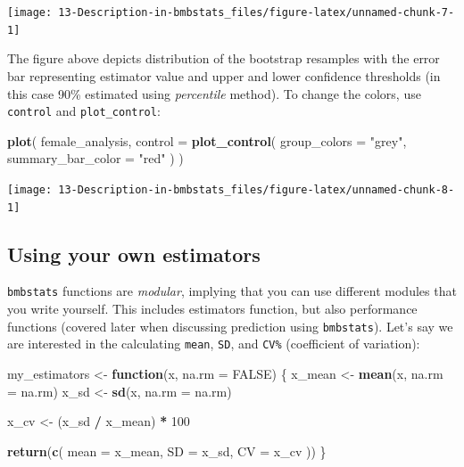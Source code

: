 \documentclass[
]{book}
\newenvironment{Shaded}{\begin{snugshade}}{\end{snugshade}}
\newcommand{\ControlFlowTok}[1]{\textcolor[rgb]{0.13,0.29,0.53}{\textbf{#1}}}
\newcommand{\DataTypeTok}[1]{\textcolor[rgb]{0.13,0.29,0.53}{#1}}
\newcommand{\DecValTok}[1]{\textcolor[rgb]{0.00,0.00,0.81}{#1}}
\newcommand{\KeywordTok}[1]{\textcolor[rgb]{0.13,0.29,0.53}{\textbf{#1}}}
\newcommand{\NormalTok}[1]{#1}
\newcommand{\OperatorTok}[1]{\textcolor[rgb]{0.81,0.36,0.00}{\textbf{#1}}}
\newcommand{\OtherTok}[1]{\textcolor[rgb]{0.56,0.35,0.01}{#1}}
\newcommand{\StringTok}[1]{\textcolor[rgb]{0.31,0.60,0.02}{#1}}
\begin{document}
\begin{center}\texttt{[image: 13-Description-in-bmbstats\_files/figure-latex/unnamed-chunk-7-1]} \end{center}

The figure above depicts distribution of the bootstrap resamples with the error bar representing estimator value and upper and lower confidence thresholds (in this case 90\% estimated using \emph{percentile} method). To change the colors, use \texttt{control} and \texttt{plot\_control}:

\begin{Shaded}
\begin{Highlighting}[]
\KeywordTok{plot}\NormalTok{(}
\NormalTok{  female\_analysis,}
  \DataTypeTok{control =} \KeywordTok{plot\_control}\NormalTok{(}
    \DataTypeTok{group\_colors =} \StringTok{"grey"}\NormalTok{,}
    \DataTypeTok{summary\_bar\_color =} \StringTok{"red"}
\NormalTok{  )}
\NormalTok{)}
\end{Highlighting}
\end{Shaded}

\begin{center}\texttt{[image: 13-Description-in-bmbstats\_files/figure-latex/unnamed-chunk-8-1]} \end{center}

\hypertarget{using-your-own-estimators}{%
\subsection{Using your own estimators}\label{using-your-own-estimators}}

\texttt{bmbstats} functions are \emph{modular}, implying that you can use different modules that you write yourself. This includes estimators function, but also performance functions (covered later when discussing prediction using \texttt{bmbstats}). Let's say we are interested in the calculating \texttt{mean}, \texttt{SD}, and \texttt{CV\%} (coefficient of variation):

\begin{Shaded}
\begin{Highlighting}[]
\NormalTok{my\_estimators <{-}}\StringTok{ }\ControlFlowTok{function}\NormalTok{(x, }\DataTypeTok{na.rm =} \OtherTok{FALSE}\NormalTok{) \{}
\NormalTok{  x\_mean <{-}}\StringTok{ }\KeywordTok{mean}\NormalTok{(x, }\DataTypeTok{na.rm =}\NormalTok{ na.rm)}
\NormalTok{  x\_sd <{-}}\StringTok{ }\KeywordTok{sd}\NormalTok{(x, }\DataTypeTok{na.rm =}\NormalTok{ na.rm)}

\NormalTok{  x\_cv <{-}}\StringTok{ }\NormalTok{(x\_sd }\OperatorTok{/}\StringTok{ }\NormalTok{x\_mean) }\OperatorTok{*}\StringTok{ }\DecValTok{100}

  \KeywordTok{return}\NormalTok{(}\KeywordTok{c}\NormalTok{(}
    \DataTypeTok{mean =}\NormalTok{ x\_mean,}
    \DataTypeTok{SD =}\NormalTok{ x\_sd,}
    \DataTypeTok{CV =}\NormalTok{ x\_cv}
\NormalTok{  ))}
\NormalTok{\}}
\end{Highlighting}
\end{Shaded}
\end{document}
